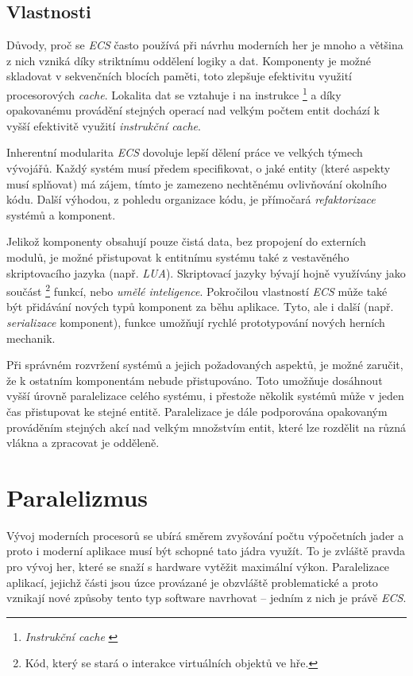 \subsection{Vlastnosti}

Důvody, proč se \emph{ECS} často používá při návrhu moderních her je mnoho a většina z nich vzniká díky striktnímu oddělení logiky a dat. Komponenty je možné skladovat v sekvenčních blocích paměti, toto zlepšuje efektivitu využití procesorových \emph{cache}. Lokalita dat se vztahuje i na instrukce \cite{InstrAreData} \footnote{\emph{Instrukční cache} \cite{CpuMemoryGap}} a díky opakovanému provádění stejných operací nad velkým počtem entit dochází k vyšší efektivitě využití \emph{instrukční cache}. 

Inherentní modularita \emph{ECS} dovoluje lepší dělení práce ve velkých týmech vývojářů. Každý systém musí předem specifikovat, o jaké entity (které aspekty musí splňovat) má zájem, tímto je zamezeno nechtěnému ovlivňování okolního kódu. Další výhodou, z pohledu organizace kódu, je přímočará \emph{refaktorizace} systémů a komponent.

Jelikož komponenty obsahují pouze čistá data, bez propojení do externích modulů, je možné přistupovat k entitnímu systému také z vestavěného skriptovacího jazyka (např. \emph{LUA}). Skriptovací jazyky bývají hojně využívány jako součást  \footnote{Kód, který se stará o interakce virtuálních objektů ve hře.} funkcí, nebo \emph{umělé inteligence}. Pokročilou vlastností \emph{ECS} může také být přidávání nových typů komponent za běhu aplikace. Tyto, ale i další (např. \emph{serializace} komponent), funkce umožňují rychlé prototypování nových herních mechanik.

Při správném rozvržení systémů a jejich požadovaných aspektů, je možné zaručit, že k ostatním komponentám nebude přistupováno. Toto umožňuje dosáhnout vyšší úrovně paralelizace celého systému, i přestože několik systémů může v jeden čas přistupovat ke stejné entitě. Paralelizace je dále podporována opakovaným prováděním stejných akcí nad velkým množstvím entit, které lze rozdělit na různá vlákna a zpracovat je odděleně.

\section{Paralelizmus}
\label{Chap:Parallelism}

Vývoj moderních procesorů se ubírá směrem zvyšování počtu výpočetních jader \cite{CPUPerfHistory} a proto i moderní aplikace musí být schopné tato jádra využít. To je zvláště pravda pro vývoj her, které se snaží s hardware vytěžit maximální výkon. Paralelizace aplikací, jejichž části jsou úzce provázané je obzvláště problematické a proto vznikají nové způsoby tento typ software navrhovat -- jedním z nich je právě \emph{ECS}. 

